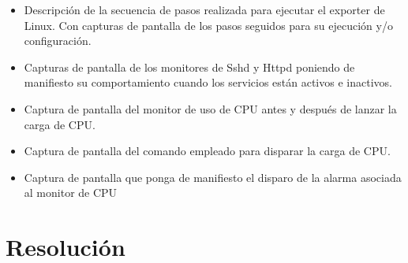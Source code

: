\documentclass[12pt]{article}
\begin{document}
\begin{itemize}
    \item Descripción de la secuencia de pasos realizada para ejecutar el exporter de Linux. Con capturas de pantalla de los pasos seguidos para su ejecución y/o configuración.
    \item Capturas de pantalla de los monitores de Sshd y Httpd poniendo de manifiesto su comportamiento cuando los servicios están activos e inactivos.
    \item Captura de pantalla del monitor de uso de CPU antes y después de lanzar la carga de CPU.
    \item Captura de pantalla del comando empleado para disparar la carga de CPU.
    \item Captura de pantalla que ponga de manifiesto el disparo de la alarma asociada al monitor de CPU
\end{itemize}

\newpage

\section{Resolución}
\end{document}
